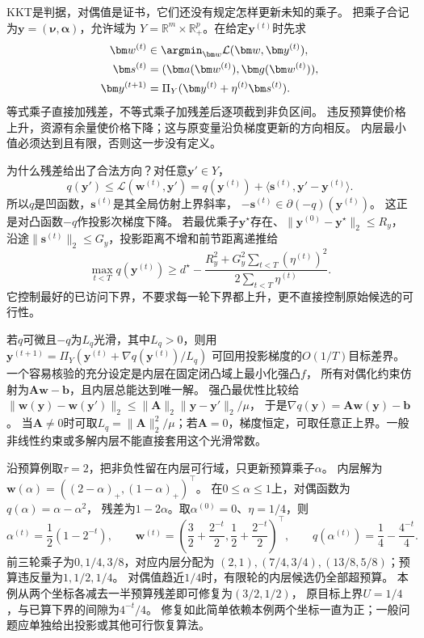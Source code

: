 KKT是判据，对偶值是证书，它们还没有规定怎样更新未知的乘子。
把乘子合记为$\bm y=(\bm\nu,\bm\alpha)$，允许域为
$Y=\mathbb R^m\times\mathbb R_+^p$。在给定$\bm y^{(t)}$时先求
\[
 \begin{aligned}
 \bm w^{(t)}&\in\argmin_{\bm w}\mathcal L(\bm w,\bm y^{(t)}),\\
 \bm s^{(t)}&=(\bm a(\bm w^{(t)}),\bm g(\bm w^{(t)})),\\
 \bm y^{(t+1)}&=\Pi_Y(\bm y^{(t)}+\eta^{(t)}\bm s^{(t)}).
 \end{aligned}
\]
等式乘子直接加残差，不等式乘子加残差后逐项截到非负区间。
违反预算使价格上升，资源有余量使价格下降；这与原变量沿负梯度更新的方向相反。
内层最小值必须达到且有限，否则这一步没有定义。

为什么残差给出了合法方向？对任意$\bm y'\in Y$，
\[
 q(\bm y')\leq\mathcal L(\bm w^{(t)},\bm y')
 =q(\bm y^{(t)})+\langle\bm s^{(t)},\bm y'-\bm y^{(t)}\rangle.
\]
所以$q$是凹函数，$\bm s^{(t)}$是其全局仿射上界斜率，
$-\bm s^{(t)}\in\partial(-q)(\bm y^{(t)})$。
这正是对凸函数$-q$作投影次梯度下降。
若最优乘子$\bm y^\star$存在、$\|\bm y^{(0)}-\bm y^\star\|_2\leq R_y$，
沿途$\|\bm s^{(t)}\|_2\leq G_y$，投影距离不增和前节距离递推给
\[
 \max_{t<T}q(\bm y^{(t)})\geq
 d^\star-\frac{R_y^2+G_y^2\sum_{t<T}(\eta^{(t)})^2}{2\sum_{t<T}\eta^{(t)}}.
\]
它控制最好的已访问下界，不要求每一轮下界都上升，更不直接控制原始候选的可行性。

若$q$可微且$-q$为$L_q$光滑，其中$L_q>0$，则用
$\bm y^{(t+1)}=\Pi_Y(\bm y^{(t)}+\nabla q(\bm y^{(t)})/L_q)$
可回用投影梯度的$O(1/T)$目标差界。
一个容易核验的充分设定是内层在固定闭凸域上最小化强凸$f$，
所有对偶化约束仿射为$\bm A\bm w-\bm b$，且内层总能达到唯一解。
强凸最优性比较给
$\|\bm w(\bm y)-\bm w(\bm y')\|_2
\leq\|\bm A\|_2\|\bm y-\bm y'\|_2/\mu$，
于是$\nabla q(\bm y)=\bm A\bm w(\bm y)-\bm b$。
当$\bm A\neq0$时可取$L_q=\|\bm A\|_2^2/\mu$；若$\bm A=0$，梯度恒定，可取任意正上界。一般非线性约束或多解内层不能直接套用这个光滑常数。

沿预算例取$\tau=2$，把非负性留在内层可行域，只更新预算乘子$\alpha$。
内层解为
$\bm w(\alpha)=((2-\alpha)_+,(1-\alpha)_+)^\top$。
在$0\leq\alpha\leq1$上，对偶函数为$q(\alpha)=\alpha-\alpha^2$，
残差为$1-2\alpha$。取$\alpha^{(0)}=0$、$\eta=1/4$，则
\[
 \alpha^{(t)}=\frac12(1-2^{-t}),\qquad
 \bm w^{(t)}=\left(\frac32+\frac{2^{-t}}2,\frac12+\frac{2^{-t}}2\right)^\top,
 \qquad q(\alpha^{(t)})=\frac14-\frac{4^{-t}}4.
\]
前三轮乘子为$0,1/4,3/8$，对应内层分配为
$(2,1),(7/4,3/4),(13/8,5/8)$；预算违反量为$1,1/2,1/4$。
对偶值趋近$1/4$时，有限轮的内层候选仍全部超预算。
本例从两个坐标各减去一半预算残差即可修复为$(3/2,1/2)$，
原目标上界$U=1/4$，与已算下界的间隙为$4^{-t}/4$。
修复如此简单依赖本例两个坐标一直为正；一般问题应单独给出投影或其他可行恢复算法。

